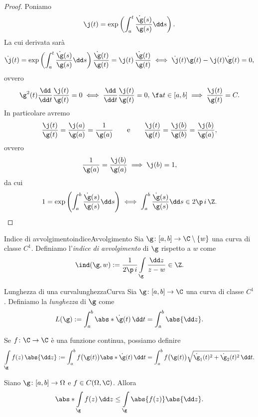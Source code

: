 \begin{proof}
	Poniamo
	\[
		\j(t) = \exp \left( \int_a^t \frac{\dot{\g}(s)}{\g(s)}\dd s \right).
	\]
	La cui derivata sarà
	\[
		\dot{\j}(t) = \exp \left( \int_a^t \frac{\dot{\g}(s)}{\g(s)}\dd s \right) \frac{\dot{\g}(t)}{\g(t)} = \j(t)\,\frac{\dot{\g}(t)}{\g(t)} \iff \dot{\j}(t)\g(t) - \j(t)\dot{\g}(t) = 0,
	\]
	ovvero
	\[
		\g^2(t) \frac{\dd}{\dd t} \frac{\j(t)}{\g(t)} = 0 \iff \frac{\dd}{\dd t} \frac{\j(t)}{\g(t)} = 0,\,\fa t \in [a,b] \implies \frac{\j(t)}{\g(t)} = C.
	\]
	In particolare avremo
	\[
		\frac{\j(t)}{\g(t)} = \frac{\j(a)}{\g(a)} = \frac{1}{\g(a)} \qquad\text{e}\qquad \frac{\j(t)}{\g(t)} = \frac{\j(b)}{\g(b)} = \frac{\j(b)}{\g(a)},
	\]
	ovvero
	\[
		\frac{1}{\g(a)} = \frac{\j(b)}{\g(a)} \implies \j(b) = 1,
	\]
	da cui
	\[
		1 = \exp \left( \int_a^b \frac{\dot{\g}(s)}{\g(s)}\dd s \right) \iff \int_a^b \frac{\dot{\g}(s)}{\g(s)}\dd s \in 2\p\,i\,\Z.\qedhere
	\]
\end{proof}

\begin{defn}{Indice di avvolgimento}{indiceAvvolgimento}
	Sia \(\g\colon [a,b] \to \C\setminus\{w\}\) una curva di classe \(C^1\).
	Definiamo l'\emph{indice di avvolgimento} di \(\g\) rispetto a \(w\) come
	\[
		\ind(\g,w) := \frac{1}{2\p\,i} \int\limits_\g \frac{\dd z}{z-w} \in \Z.
	\]
\end{defn}

\begin{defn}{Lunghezza di una curva}{lunghezzaCurva}
	Sia \(\g\colon [a,b] \to \C\) una curva di classe \(C^1\).
	Definiamo la \emph{lunghezza} di \(\g\) come
	\[
		L(\g) := \int_a^b \abs*{\dot{\g}(t)}\,\dd t = \int_a^b \abs{\dd z}.
	\]
\end{defn}

\begin{notz}
	Se \(f\colon \C \to \C\) è una funzione continua, possiamo definire
	\[
		\int\limits_\g f(z)\,\abs{\dd z} := \int_a^b f\big(\g(t)\big)\abs*{\dot{\g}(t)}\,\dd t = \int_a^b f\big(\g(t)\big)\sqrt{\dot{\g}_1(t)^2+\dot{\g}_2(t)^2}\,\dd t.
	\]
\end{notz}
%
%
\begin{pr}\label{intLinea:1}
	Siano \(\g\colon [a,b]\to \Omega\) e \(f\in C(\Omega,\C)\). Allora
	\[
		\abs*{\int\limits_\g f(z)\,\dd z} \le \int\limits_\g \abs{f(z)}\abs{\dd z}.
	\]
\end{pr}

